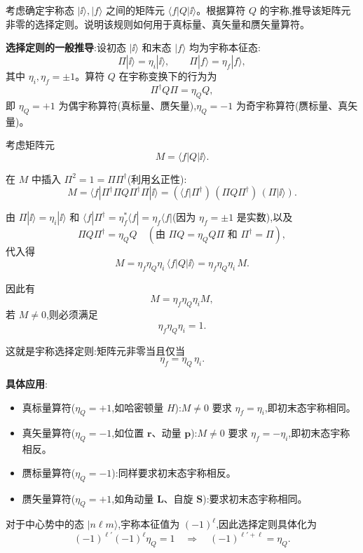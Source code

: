 \begin{question}
考虑确定宇称态 $|\ii\rangle,|f\rangle$ 之间的矩阵元 $\langle f|Q|\ii\rangle$。根据算符 $Q$ 的宇称,推导该矩阵元非零的选择定则。说明该规则如何用于真标量、真矢量和赝矢量算符。
\end{question}
\begin{solution}
	\textbf{选择定则的一般推导}:设初态 $|\ii\rangle$ 和末态 $|f\rangle$ 均为宇称本征态:
	\[
	\Pi|\ii\rangle=\eta_i|\ii\rangle,\qquad \Pi|f\rangle=\eta_f|f\rangle,
	\]
	其中 $\eta_i,\eta_f=\pm1$。算符 $Q$ 在宇称变换下的行为为
	\[
	\Pi^\dagger Q\Pi = \eta_Q Q,
	\]
	即 $\eta_Q=+1$ 为偶宇称算符(真标量、赝矢量),$\eta_Q=-1$ 为奇宇称算符(赝标量、真矢量)。

	考虑矩阵元
	\[
	M = \langle f|Q|\ii\rangle.
	\]

	在 $M$ 中插入 $\Pi^2=1 = \Pi\Pi^\dagger$(利用幺正性):
	\[
	M = \langle f|\Pi^\dagger\Pi Q \Pi^\dagger\Pi|\ii\rangle
	= (\langle f|\Pi^\dagger)\,(\Pi Q\Pi^\dagger)\,(\Pi|\ii\rangle).
	\]

	由 $\Pi|\ii\rangle=\eta_i|\ii\rangle$ 和 $\langle f|\Pi^\dagger = \eta_f^*\langle f| = \eta_f\langle f|$(因为 $\eta_f=\pm1$ 是实数),以及
	\[
	\Pi Q\Pi^\dagger = \eta_Q Q \quad(\text{由 }\Pi Q = \eta_Q Q\Pi\text{ 和 }\Pi^\dagger=\Pi),
	\]
	代入得
	\[
	M = \eta_f\eta_Q\eta_i\,\langle f|Q|\ii\rangle = \eta_f\eta_Q\eta_i\,M.
	\]

	因此有
	\[
	M = \eta_f\eta_Q\eta_i M,
	\]
	若 $M\neq0$,则必须满足
	\[
	\eta_f\eta_Q\eta_i = 1.
	\]

	这就是宇称选择定则:矩阵元非零当且仅当
	\[
	\boxed{\eta_f = \eta_Q\,\eta_i}.
	\]

	\textbf{具体应用}:
	\begin{itemize}
	\item 真标量算符($\eta_Q=+1$,如哈密顿量 $H$):$M\neq0$ 要求 $\eta_f=\eta_i$,即初末态宇称相同。
	\item 真矢量算符($\eta_Q=-1$,如位置 $\mathbf r$、动量 $\mathbf p$):$M\neq0$ 要求 $\eta_f=-\eta_i$,即初末态宇称相反。
	\item 赝标量算符($\eta_Q=-1$):同样要求初末态宇称相反。
	\item 赝矢量算符($\eta_Q=+1$,如角动量 $\mathbf L$、自旋 $\mathbf S$):要求初末态宇称相同。
	\end{itemize}

	对于中心势中的态 $|n\ell m\rangle$,宇称本征值为 $(-1)^\ell$,因此选择定则具体化为
	\[
	(-1)^{\ell'}(-1)^{\ell}\eta_Q = 1 \quad\Longrightarrow\quad (-1)^{\ell'+\ell} = \eta_Q.
	\]
	\end{solution}


